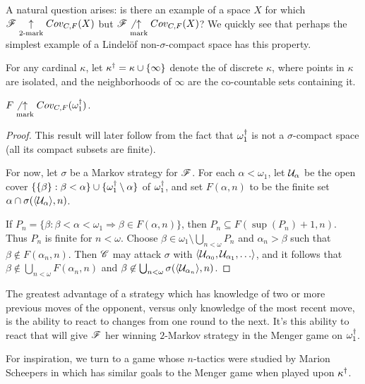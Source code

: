 A natural question arises: is there an example of a space $X$ for which
$\mathscr{F}\underset{2\text{-mark}}{\uparrow}Cov_{C,F}(X)$ but $\mathscr{F}\not\underset{\text{mark}}{\uparrow}Cov_{C,F}(X)$? We quickly
see that perhaps the simplest example of a Lindel\"of non-$\sigma$-compact
space has this property.

\begin{defn}
  For any cardinal $\kappa$, let $\kappa^\dagger=\kappa\cup\{\infty\}$ denote
  the  of discrete $\kappa$, where points in
  $\kappa$ are isolated, and the neighborhoods of $\infty$ are the co-countable
  sets containing it.
\end{defn}

\begin{thm}
  $F\not\underset{\text{mark}}{\uparrow}Cov_{C,F}(\omega_1^\dagger)$.
\end{thm}

\begin{proof}
  This result will later follow from the fact that
  $\omega^\dagger_1$ is not a $\sigma$-compact space (all its compact subsets
  are finite).

  For now, let $\sigma$ be a Markov strategy for $\mathscr{F}$. For
  each $\alpha<\omega_1$, let $\mathcal{U}_\alpha$ be the open cover
  $\{\{\beta\}:\beta<\alpha\}\cup\{\omega_1^\dagger\setminus\alpha\}$ of
  $\omega_1^\dagger$, and set $F(\alpha,n)$ to be the finite set
  $\alpha\cap\sigma(\langle\mathcal{U}_\alpha\rangle,n)$.

  If
    $
      P_n =
      \{\beta: \beta < \alpha < \omega_1 \Rightarrow \beta \in F(\alpha,n)\}
    $,
  then $P_n\subseteq F(\sup(P_n)+1,n)$. Thus $P_n$ is finite for $n<\omega$.
  Choose $\beta\in\omega_1\setminus \bigcup_{n<\omega}P_n$
  and $\alpha_n>\beta$ such that $\beta\not\in F(\alpha_n,n)$.
  Then $\mathscr{C}$ may attack
  $\sigma$ with $\<\mc U_{\alpha_0}, \mc U_{\alpha_1},\dots\>$,
  and it follows that
  $\beta\not\in \bigcup_{n<\omega}F(\alpha_n,n)$ and
  $\beta\not\in \bigcup_{n<\omega}\sigma(\langle\mathcal{U}_{\alpha_n}\rangle,n)$.
\end{proof}

The greatest advantage of a strategy which has knowledge of two or more previous
moves of the opponent, versus only knowledge of the most recent move, is the
ability to react to changes from one round to the next. It's this ability to
react that will give $\mathscr{F}$ her winning $2$-Markov strategy in the Menger
game on $\omega^\dagger_1$.

For inspiration, we turn to a game whose $n$-tactics were studied by Marion
Scheepers in \cite{MR1129143} which has similar goals to the Menger game when
played upon $\kappa^\dagger$.

